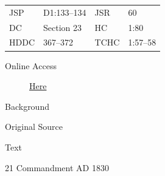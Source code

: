 				\begin{tabular}{p{0.5in}p{1in}p{0.5in}p{1in}}
				JSP	 	& D1:133--134	& JSR 		& 60	 \\
				DC	 	& Section 23	& HC 		& 1:80	 \\
				HDDC 	& 367--372		& TCHC 		& 1:57--58 \\
				\end{tabular}
			
			\begin{description}
				\item[Online Access] \href{https://www.josephsmithpapers.org/paper-summary/revelation-april-1830-d-dc-235/1}{Here}
			\end{description}
			
			\begin{description}
				\item[Background]
			\end{description}
			
			
			\begin{description}
				\item[Original Source]
			\end{description}
			
			
			\begin{description}
				\item[Text]
			\end{description}
			
				\begin{tightcenter}
				21 Commandment AD 1830
				\end{tightcenter}
				
